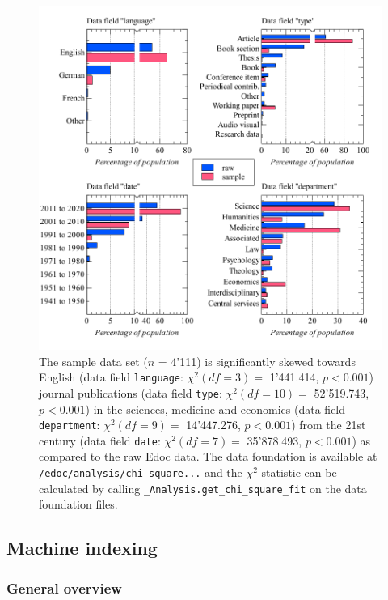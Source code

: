 \begin{figure}
\centering
\includegraphics{images/raw_sample_analysis.pdf}
\caption{The sample data set (\(n\) = 4'111) is significantly skewed
towards English (data field \texttt{language}: \(\chi^2 (df=3) =\)
1'441.414, \(p < 0.001\)) journal publications (data field
\texttt{type}: \(\chi^2 (df=10) =\) 52'519.743, \(p < 0.001\)) in the
sciences, medicine and economics (data field \texttt{department}:
\(\chi^2 (df=9) =\) 14'447.276, \(p < 0.001\)) from the 21st century
(data field \texttt{date}: \(\chi^2 (df=7) =\) 35'878.493,
\(p < 0.001\)) as compared to the raw Edoc data. The data foundation is
available at \texttt{/edoc/analysis/chi\_square...} and the
\(\chi^2\)-statistic can be calculated by calling
\texttt{\_Analysis.get\_chi\_square\_fit} on the data foundation files.}
\end{figure}

\hypertarget{machine-indexing}{%
\subsection{Machine indexing}\label{machine-indexing}}

\hypertarget{general-overview}{%
\subsubsection{General overview}\label{general-overview}}

